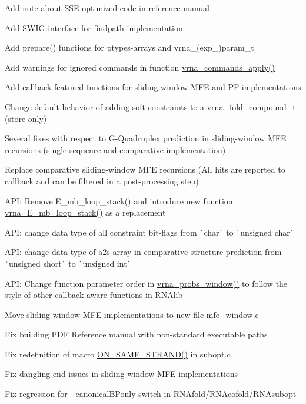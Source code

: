 \begin{DoxyItemize}
\item Add note about S\+SE optimized code in reference manual
\item Add S\+W\+IG interface for findpath implementation
\item Add prepare() functions for ptypes-\/arrays and vrna\+\_\+(exp\+\_\+)param\+\_\+t
\item Add warnings for ignored commands in function \mbox{\hyperlink{group__file__utils_ga5e993fc4b9602af73aaaab4d3b3cd9a9}{vrna\+\_\+commands\+\_\+apply()}}
\item Add callback featured functions for sliding window M\+FE and PF implementations
\item Change default behavior of adding soft constraints to a vrna\+\_\+fold\+\_\+compound\+\_\+t (store only)
\item Several fixes with respect to G-\/\+Quadruplex prediction in sliding-\/window M\+FE recursions (single sequence and comparative implementation)
\item Replace comparative sliding-\/window M\+FE recursions (All hits are reported to callback and can be filtered in a post-\/processing step)
\item A\+PI\+: Remove E\+\_\+mb\+\_\+loop\+\_\+stack() and introduce new function \mbox{\hyperlink{group__loops_ga73f048d35475e1d8f50b7d4ac6a2aeb6}{vrna\+\_\+\+E\+\_\+mb\+\_\+loop\+\_\+stack()}} as a replacement
\item A\+PI\+: change data type of all constraint bit-\/flags from \`{}char\`{} to \`{}unsigned char\`{}
\item A\+PI\+: change data type of a2s array in comparative structure prediction from \`{}unsigned short\`{} to \`{}unsigned int\`{}
\item A\+PI\+: Change function parameter order in \mbox{\hyperlink{group__local__pf__fold_ga70ec33810fa17a9f67a7c59f156d0137}{vrna\+\_\+probs\+\_\+window()}} to follow the style of other callback-\/aware functions in R\+N\+Alib
\item Move sliding-\/window M\+FE implementations to new file mfe\+\_\+window.\+c
\item Fix building P\+DF Reference manual with non-\/standard executable paths
\item Fix redefinition of macro \mbox{\hyperlink{interior__loops_8h_a6b109d72bf39073254090cf105a17641}{O\+N\+\_\+\+S\+A\+M\+E\+\_\+\+S\+T\+R\+A\+N\+D()}} in subopt.\+c
\item Fix dangling end issues in sliding-\/window M\+FE implementations
\item Fix regression for -\/-\/canonical\+B\+Ponly switch in R\+N\+Afold/\+R\+N\+Acofold/\+R\+N\+Asubopt

\end{DoxyItemize}
